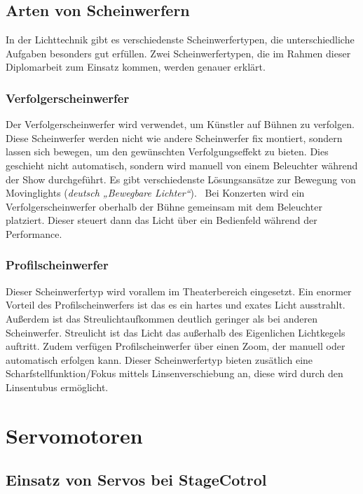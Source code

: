 \subsection{Arten von Scheinwerfern}
In der Lichttechnik gibt es verschiedenste Scheinwerfertypen, die unterschiedliche Aufgaben besonders gut erfüllen. Zwei Scheinwerfertypen, die im Rahmen dieser Diplomarbeit zum Einsatz kommen, werden genauer erklärt.

\subsubsection{Verfolgerscheinwerfer}
Der Verfolgerscheinwerfer wird verwendet, um Künstler auf Bühnen zu verfolgen. Diese Scheinwerfer werden nicht wie andere Scheinwerfer fix montiert, sondern lassen sich bewegen, um den gewünschten Verfolgungseffekt zu bieten. Dies geschieht nicht automatisch, sondern wird manuell von einem Beleuchter während der Show durchgeführt. Es gibt verschiedenste Lösungsansätze zur Bewegung von Movinglights (\emph{deutsch „Bewegbare Lichter“}). \ Bei Konzerten wird ein Verfolgerscheinwerfer oberhalb der Bühne gemeinsam mit dem Beleuchter platziert. Dieser steuert dann das Licht über ein Bedienfeld während der Performance.\\
\cite{Verfolgerscheinwerfer}

\subsubsection{Profilscheinwerfer}
Dieser Scheinwerfertyp wird vorallem im Theaterbereich eingesetzt. Ein enormer Vorteil des Profilscheinwerfers ist das es ein hartes und exates Licht ausstrahlt. Außerdem ist das Streulichtaufkommen deutlich geringer als bei anderen Scheinwerfer. Streulicht ist das Licht das außerhalb des Eigenlichen Lichtkegels auftritt. Zudem verfügen Profilscheinwerfer über einen Zoom, der manuell oder automatisch erfolgen kann. Dieser Scheinwerfertyp bieten zusätlich eine Scharfstellfunktion/Fokus mittels Linsenverschiebung an, diese wird durch den Linsentubus ermöglicht.\\
\cite{Profilscheinwerfer}

\section{Servomotoren}
\subsection{Einsatz von Servos bei StageCotrol}
